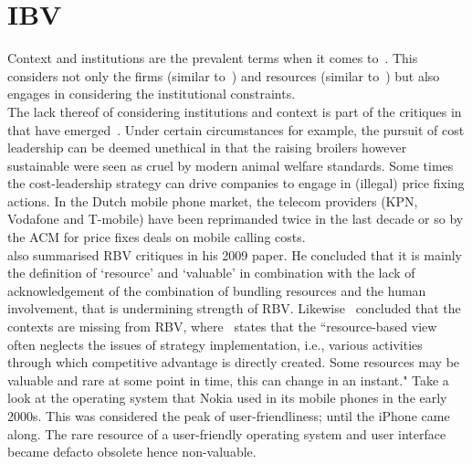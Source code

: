 \section{\glsdesc{IBV}}

Context and institutions are the prevalent terms when it comes to~\ibv. %
This \ibv considers not only the firms (similar to~\cite{Porter:1980}) and resources (similar to~\cite{Barney:1991}) but also engages in considering the institutional constraints.\\
The lack thereof of considering institutions and context is part of the critiques in that have emerged~\cite{Narayanan:2005}.
Under certain circumstances for example, the pursuit of cost leadership can be deemed unethical in that the raising broilers however sustainable were seen as cruel by modern animal welfare standards. 
Some times the cost-leadership strategy can drive companies to engage in (illegal) price fixing actions. 
In the Dutch mobile phone market, the telecom providers (KPN, Vodafone and T-mobile) have been reprimanded twice in the last decade or so by the \gls{ACM} for price fixes deals on mobile calling costs. \\
\cite{Kraaijenbrink:2009} also summarised \gls{RBV} critiques in his 2009 paper. 
He concluded that it is mainly the definition of `resource' and `valuable' in combination with the lack of acknowledgement of the combination of bundling resources and the human involvement, that is undermining strength of \gls{RBV}.
Likewise~\cite{Priem:2001} concluded that the contexts are missing from \gls{RBV}, where~\cite{Dung:2012} states that the ``resource-based view often neglects the issues of strategy implementation, i.e., various activities through which competitive advantage is directly created. Some resources may be valuable and rare at some point in time, this can change in an instant." 
Take a look at the operating system that Nokia used in its mobile phones in the early 2000s. 
This was considered the peak of user-friendliness; until the iPhone came along. 
The rare resource of a user-friendly operating system and user interface became defacto obsolete hence non-valuable.\\

